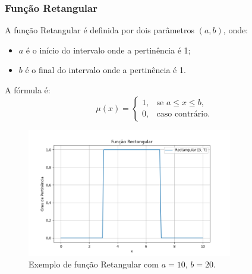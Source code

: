 \documentclass[a4paper,12pt]{article}
\begin{document}
\subsubsection{Função Retangular}
A função Retangular é definida por dois parâmetros $(a, b)$, onde:
\begin{itemize}
    \item $a$ é o início do intervalo onde a pertinência é 1;
    \item $b$ é o final do intervalo onde a pertinência é 1.
\end{itemize}
A fórmula é:
\[
\mu(x) =
\begin{cases}
1, & \text{se } a \leq x \leq b, \\
0, & \text{caso contrário.}
\end{cases}
\]
\begin{figure}[H]
    \centering
    \includegraphics[width=0.8\textwidth]{img/rectangular.png}
    \caption{Exemplo de função Retangular com $a=10$, $b=20$.}
    \label{fig:funcao_retangular}
\end{figure}
\end{document}
